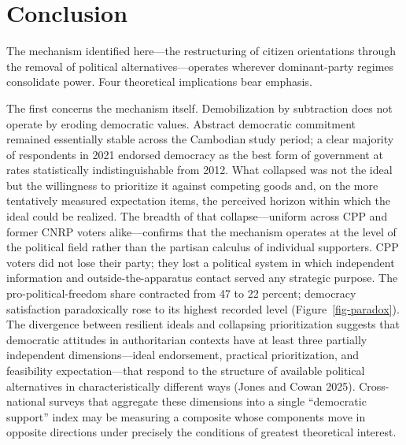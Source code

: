 \documentclass[Review,times,sageh,doublespace]{sagej}
\begin{document}
\section{Conclusion}\label{conclusion}

The mechanism identified here---the restructuring of citizen
orientations through the removal of political alternatives---operates
wherever dominant-party regimes consolidate power. Four theoretical
implications bear emphasis.

The first concerns the mechanism itself. Demobilization by subtraction
does not operate by eroding democratic values. Abstract democratic
commitment remained essentially stable across the Cambodian study
period; a clear majority of respondents in 2021 endorsed democracy as
the best form of government at rates statistically indistinguishable
from 2012. What collapsed was not the ideal but the willingness to
prioritize it against competing goods and, on the more tentatively
measured expectation items, the perceived horizon within which the ideal
could be realized. The breadth of that collapse---uniform across CPP and
former CNRP voters alike---confirms that the mechanism operates at the
level of the political field rather than the partisan calculus of
individual supporters. CPP voters did not lose their party; they lost a
political system in which independent information and
outside-the-apparatus contact served any strategic purpose. The
pro-political-freedom share contracted from 47 to 22 percent; democracy
satisfaction paradoxically rose to its highest recorded level
(Figure~\ref{fig-paradox}). The divergence between resilient ideals and
collapsing prioritization suggests that democratic attitudes in
authoritarian contexts have at least three partially independent
dimensions---ideal endorsement, practical prioritization, and
feasibility expectation---that respond to the structure of available
political alternatives in characteristically different ways (Jones and
Cowan 2025). Cross-national surveys that aggregate these dimensions into
a single ``democratic support'' index may be measuring a composite whose
components move in opposite directions under precisely the conditions of
greatest theoretical interest.
\end{document}
